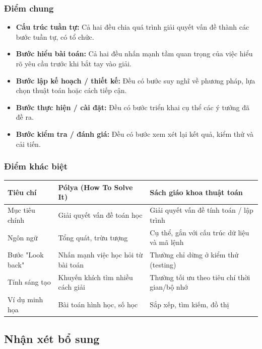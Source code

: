 \documentclass[12pt,a4paper]{article}
\begin{document}
\subsubsection*{Điểm chung}

\begin{itemize}
    \item \textbf{Cấu trúc tuần tự:} Cả hai đều chia quá trình giải quyết vấn đề thành các bước tuần tự, có tổ chức.
    \item \textbf{Bước hiểu bài toán:} Cả hai đều nhấn mạnh tầm quan trọng của việc hiểu rõ yêu cầu trước khi bắt tay vào giải.
    \item \textbf{Bước lập kế hoạch / thiết kế:} Đều có bước suy nghĩ về phương pháp, lựa chọn thuật toán hoặc cách tiếp cận.
    \item \textbf{Bước thực hiện / cài đặt:} Đều có bước triển khai cụ thể các ý tưởng đã đề ra.
    \item \textbf{Bước kiểm tra / đánh giá:} Đều có bước xem xét lại kết quả, kiểm thử và cải tiến.
\end{itemize}

\subsubsection*{Điểm khác biệt}

\begin{center}
\begin{tabular}{|l|l|l|}
\hline
\textbf{Tiêu chí} & \textbf{Pólya (How To Solve It)} & \textbf{Sách giáo khoa thuật toán} \\
\hline
Mục tiêu chính & Giải quyết vấn đề toán học & Giải quyết vấn đề tính toán / lập trình \\
\hline
Ngôn ngữ & Tổng quát, trừu tượng & Cụ thể, gắn với cấu trúc dữ liệu và mã lệnh \\
\hline
Bước "Look back" & Nhấn mạnh việc học hỏi từ bài toán & Thường chỉ dừng ở kiểm thử (testing) \\
\hline
Tính sáng tạo & Khuyến khích tìm nhiều cách giải & Thường tối ưu theo tiêu chí thời gian/bộ nhớ \\
\hline
Ví dụ minh họa & Bài toán hình học, số học & Sắp xếp, tìm kiếm, đồ thị \\
\hline
\end{tabular}
\end{center}

\subsection*{Nhận xét bổ sung}
\end{document}
